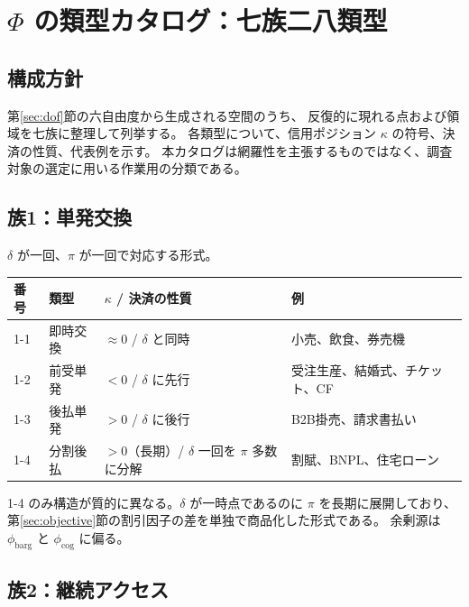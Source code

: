 \chapter{\texorpdfstring{$\Phi$}{Φ} の類型カタログ：七族二八類型}
\label{ch:catalog}

\section{構成方針}

第\ref{sec:dof}節の六自由度から生成される空間のうち、
反復的に現れる点および領域を七族に整理して列挙する。
各類型について、信用ポジション $\kappa$ の符号、決済の性質、代表例を示す。
本カタログは網羅性を主張するものではなく、調査対象の選定に用いる作業用の分類である。

\section{族1：単発交換}

$\delta$ が一回、$\pi$ が一回で対応する形式。

\begin{center}
\begin{tabularx}{\textwidth}{@{}llXX@{}}
\toprule
番号 & 類型 & $\kappa$ / 決済の性質 & 例 \\
\midrule
1-1 & 即時交換 & $\approx 0$ / $\delta$ と同時 & 小売、飲食、券売機 \\
1-2 & 前受単発 & $<0$ / $\delta$ に先行 & 受注生産、結婚式、チケット、CF \\
1-3 & 後払単発 & $>0$ / $\delta$ に後行 & B2B掛売、請求書払い \\
1-4 & 分割後払 & $>0$（長期）/ $\delta$ 一回を $\pi$ 多数に分解 & 割賦、BNPL、住宅ローン \\
\bottomrule
\end{tabularx}
\label{tab:family-1-catalog}
\end{center}

1-4 のみ構造が質的に異なる。$\delta$ が一時点であるのに $\pi$ を長期に展開しており、
第\ref{sec:objective}節の割引因子の差を単独で商品化した形式である。
余剰源は $\phi_{\mathrm{barg}}$ と $\phi_{\mathrm{cog}}$ に偏る。

\section{族2：継続アクセス}

